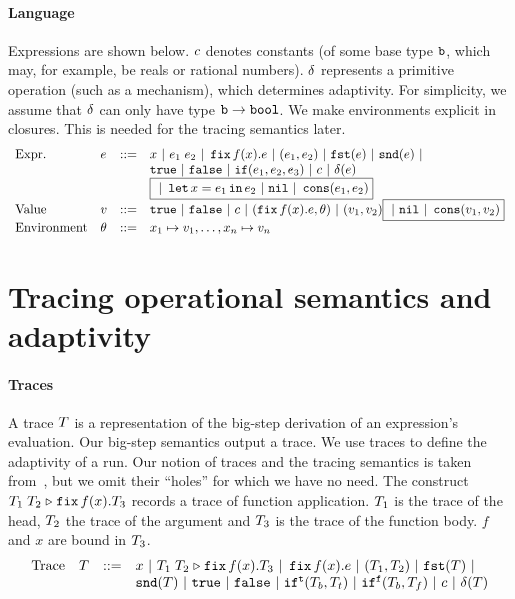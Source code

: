 \documentclass[a4paper,11pt]{article}
\theoremstyle{definition}
\begin{document}
\paragraph{Language}
Expressions are shown below. $c$ denotes constants (of some base
type $\mathtt{b}$, which may, for example, be reals or rational
numbers). $\delta$ represents a primitive operation (such as a
mechanism), which determines adaptivity. For simplicity, we assume
that $\delta$ can only have type $\mathtt{b} \to \mathtt{bool}$. We make
environments explicit in closures. This is needed for the tracing
semantics later.
\[\begin{array}{llll}
\mbox{Expr.} & \expr & ::= & x ~|~ \expr_1 \eapp \expr_2 ~|~ \efix f(x).\expr
 ~|~ (\expr_1, \expr_2) ~|~ \eprojl(\expr) ~|~ \eprojr(\expr) ~| \\
%
& & & \etrue ~|~ \efalse ~|~ \eif(\expr_1, \expr_2, \expr_3) ~|~
\econst ~|~ \eop(\expr) \\
& & & \boxed{~|~ \elet x = \expr_1 \ein \expr_2 ~|~ \enil ~|~  \econs (
      \expr_1, \expr_2) } \\
%
\mbox{Value} & \valr & ::= & \etrue ~|~ \efalse ~|~ \econst ~|~
(\efix f(x).\expr, \env) ~|~ (\valr_1, \valr_2) 
    \boxed{  ~|~ \enil ~|~ \econs (\valr_1, \valr_2)} \\
%
\mbox{Environment} & \env & ::= & x_1 \mapsto \valr_1, \ldots, x_n \mapsto \valr_n
\end{array}\]





\section{Tracing operational semantics and adaptivity}

\paragraph{Traces}
A trace $T$ is a representation of the big-step derivation of an
expression's evaluation. Our big-step semantics output a trace. We use
traces to define the adaptivity of a run. Our notion of traces and the
tracing semantics is taken from~\cite[Section 4]{perera:dep}, but we
omit their ``holes'' for which we have no need. The construct
$T_1 \; T_2 \mathrel{\triangleright} {\mathop{\mathtt{fix}} f(x).T_3}$ records a trace of function
application. $T_1$ is the trace of the head, $T_2$ the trace of
the argument and $T_3$ is the trace of the function body. $f$ and
$x$ are bound in $T_3$.
%
\[\begin{array}{llll}
\mbox{Trace} & \tr & ::= & x ~|~ \trapp{\tr_1}{\tr_2}{f}{x}{\tr_3} ~|~
\trfix f(x).e ~|~ (\tr_1, \tr_2) ~|~ \trprojl(\tr) ~|\\ 
%
& & & \trprojr(\tr) ~|~ \trtrue ~|~ \trfalse ~|~ \trift(\tr_b, \tr_t)
~|~ \triff(\tr_b, \tr_f) ~|~ \trconst ~|~ \trop(\tr)
\end{array}\]
\end{document}
